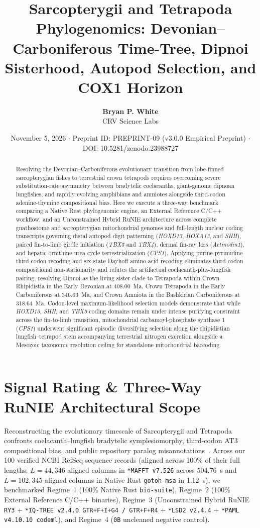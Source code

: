 \documentclass[10pt,letterpaper]{article}
\title{\textbf{Sarcopterygii and Tetrapoda Phylogenomics: Devonian--Carboniferous Time-Tree, Dipnoi Sisterhood, Autopod Selection, and COX1 Horizon}}
\author{\textbf{Bryan P. White}\\CRV Science Labs}
\date{November 5, 2026 $\cdot$ Preprint ID: PREPRINT-09 (v3.0.0 Empirical Preprint) $\cdot$ DOI: 10.5281/zenodo.23988727}
\begin{document}
\maketitle

\begin{abstract}
Resolving the Devonian--Carboniferous evolutionary transition from lobe-finned sarcopterygian fishes to terrestrial crown tetrapods requires overcoming severe substitution-rate asymmetry between bradytelic coelacanths, giant-genome dipnoan lungfishes, and rapidly evolving amphibians and amniotes alongside third-codon adenine-thymine compositional bias. Here we execute a three-way benchmark comparing a Native Rust phylogenomic engine, an External Reference C/C++ workflow, and an Unconstrained Hybrid RuNIE architecture across complete gnathostome and sarcopterygian mitochondrial genomes and full-length nuclear coding transcripts governing distal autopod digit patterning (\emph{HOXD13}, \emph{HOXA13}, and \emph{SHH}), paired fin-to-limb girdle initiation (\emph{TBX5} and \emph{TBX4}), dermal fin-ray loss (\emph{Actinodin1}), and hepatic ornithine-urea cycle terrestrialization (\emph{CPS1}). Applying purine-pyrimidine third-codon recoding and six-state Dayhoff amino-acid recoding eliminates third-codon compositional non-stationarity and refutes the artifactual coelacanth-plus-lungfish pairing, resolving Dipnoi as the living sister clade to Tetrapoda within Crown Rhipidistia in the Early Devonian at 408.00~Ma, Crown Tetrapoda in the Early Carboniferous at 346.63~Ma, and Crown Amniota in the Bashkirian Carboniferous at 318.64~Ma. Codon-level maximum-likelihood selection models demonstrate that while \emph{HOXD13}, \emph{SHH}, and \emph{TBX5} coding domains remain under intense purifying constraint across the fin-to-limb transition, mitochondrial carbamoyl-phosphate synthase 1 (\emph{CPS1}) underwent significant episodic diversifying selection along the rhipidistian lungfish--tetrapod stem accompanying terrestrial nitrogen excretion alongside a Mesozoic taxonomic resolution ceiling for standalone mitochondrial barcoding.
\end{abstract}

\section{Signal Rating \& Three-Way RuNIE Architectural Scope}
Reconstructing the evolutionary timescale of Sarcopterygii and Tetrapoda confronts coelacanth--lungfish bradytelic symplesiomorphy, third-codon AT3 compositional bias, and public repository paralog misannotations~\cite{white2026runie,amemiya2013coelacanth,meyer2021lungfish,wang2021africanlungfish,irisarri2017phylo,simoes2022tetrapod}. Across our 100 verified NCBI RefSeq sequence records (aligned across 100\% of their full lengths: $L = 44{,}346$ aligned columns in \texttt{*MAFFT v7.526} across 504.76~s and $L = 102{,}345$ aligned columns in Native Rust \texttt{gotoh-msa} in 1.12~s), we benchmarked Regime~1 (100\% Native Rust \texttt{bio-suite}), Regime~2 (100\% External Reference C/C++ binaries), Regime~3 (Unconstrained Hybrid RuNIE \texttt{RY3} + \texttt{*IQ-TREE v2.4.0 GTR+F+I+G4 / GTR+F+R4} + \texttt{*LSD2 v2.4.4} + \texttt{*PAML v4.10.10 codeml}), and Regime~4 (\texttt{0B} uncleaned negative control).
\end{document}
